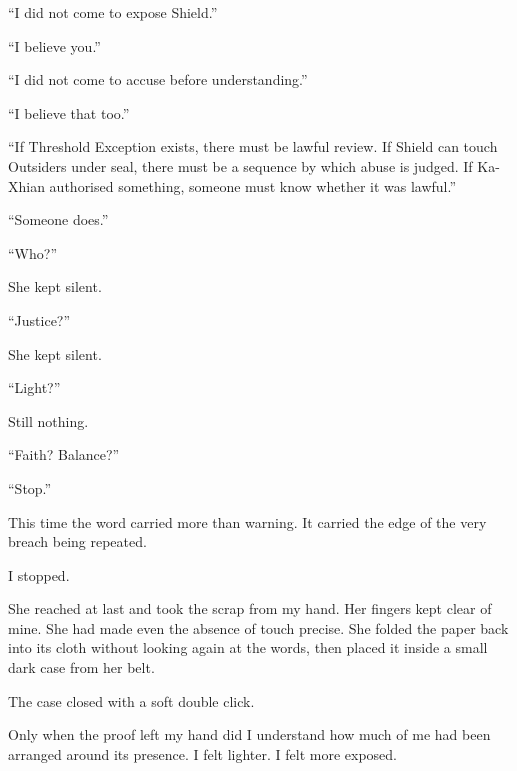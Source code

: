 ``I did not come to expose Shield.''\par

``I believe you.''\par

``I did not come to accuse before understanding.''\par

``I believe that too.''\par

``If Threshold Exception exists, there must be lawful review. If Shield can touch Outsiders under seal, there must be a sequence by which abuse is judged. If Ka-Xhian authorised something, someone must know whether it was lawful.''\par

``Someone does.''\par

``Who?''\par

She kept silent.\par

``Justice?''\par

She kept silent.\par

``Light?''\par

Still nothing.\par

``Faith? Balance?''\par

``Stop.''\par

This time the word carried more than warning. It carried the edge of the very breach being repeated.\par

I stopped.\par

She reached at last and took the scrap from my hand. Her fingers kept clear of mine. She had made even the absence of touch precise. She folded the paper back into its cloth without looking again at the words, then placed it inside a small dark case from her belt.\par

The case closed with a soft double click.\par

Only when the proof left my hand did I understand how much of me had been arranged around its presence. I felt lighter. I felt more exposed.\par

